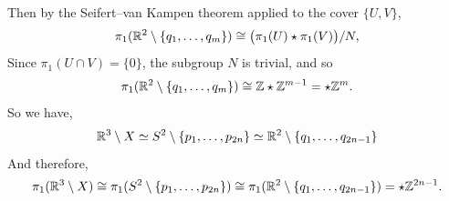\documentclass[12pt]{article}
\begin{document}
\begin{solution}
    Then by the Seifert--van Kampen theorem applied to the cover $\{U, V\}$,
    \[
        \pi_1(\mathbb R^2 \setminus \{q_1, \ldots, q_m\}) \cong \bigl(\pi_1(U) \star \pi_1(V)\bigr) / N,
    \]
    Since $\pi_1(U \cap V) = \{0\}$, the subgroup $N$ is trivial, and so
    \[
        \pi_1(\mathbb R^2 \setminus \{q_1, \ldots, q_m\}) \cong \mathbb Z \star \mathbb Z^{m-1} = \star \mathbb Z^m.
    \]
    So we have, 
    \[\mathbb R^3 \setminus X \simeq S^2 \setminus \{p_1, \ldots, p_{2n}\} \simeq \mathbb R^2 \setminus \{q_1, \ldots, q_{2n-1}\}\]
    And therefore, 
    \[\pi_1(\mathbb R^3 \setminus X) \cong \pi_1(S^2 \setminus \{p_1, \ldots, p_{2n}\}) \cong \pi_1(\mathbb R^2 \setminus \{q_1, \ldots, q_{2n-1}\}) = \star \mathbb Z^{2n-1}.\]
\end{solution}




\end{document}
